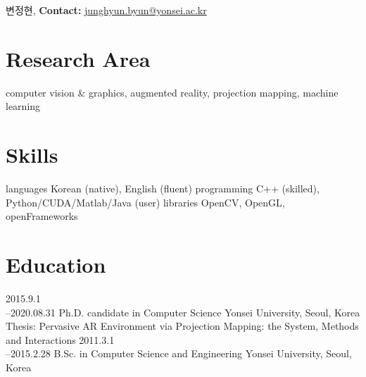 \documentclass[]{friggeri-cv}
\begin{document}
       { 변정현, 
       \textbf{Contact:}
       \href{mailto:junghyun.byun@yonsei.ac.kr}{junghyun.byun@yonsei.ac.kr}}


\section{Research Area}
computer vision \& graphics, augmented reality, projection mapping, machine learning

\section{Skills}
\begin{entrylist}
\entry
	{languages} {Korean (native), English (fluent)} {} {}
	\vspace{-3\parsep}
\entry
	{programming} {C++ (skilled), Python/CUDA/Matlab/Java (user)} {} {}
	\vspace{-3\parsep}
\entry
	{libraries} { OpenCV, OpenGL, openFrameworks} {} {}
	\vspace{-2\parsep}
\end{entrylist}

\section{Education}
\begin{entrylist}
  \entry
    {2015.9.1\\--2020.08.31}
    {Ph.D. {\normalfont candidate in Computer Science}}
    {Yonsei University, Seoul, Korea}
    {Thesis: Pervasive AR Environment via Projection Mapping: the System, Methods and Interactions}
  \entry
    {2011.3.1\\--2015.2.28}
    {B.Sc. {\normalfont in Computer Science and Engineering}}
    {Yonsei University, Seoul, Korea}
    {}
\end{entrylist}

\end{document}
